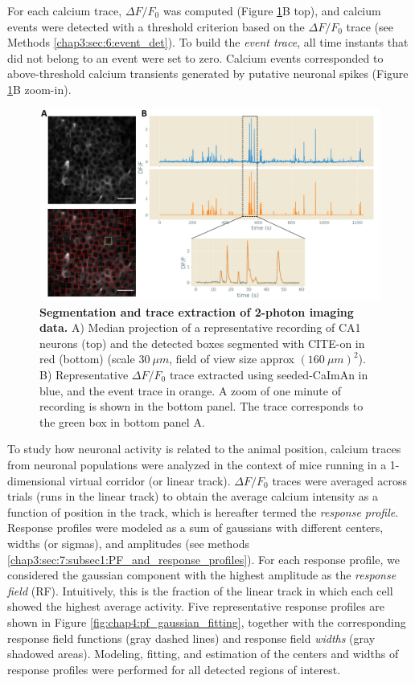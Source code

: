 For each calcium trace, $\Delta F/F_0$ was computed (Figure \ref{fig:chap4:segmentation_traces_2p}B top), and calcium events were detected with a threshold criterion based on the $\Delta F/F_0$ trace (see Methods \ref{chap3:sec:6:event_det}).
To build the \textit{event trace}, all time instants that did not belong to an event were set to zero. 
Calcium events corresponded to above-threshold calcium transients generated by putative neuronal spikes (Figure \ref{fig:chap4:segmentation_traces_2p}B zoom-in).
\begin{figure}[h]
    \centering
    \includegraphics[trim={0 0 150 0},clip,width=\textwidth]{Figures/Chapter4/segmentation_traces_2p.pdf}
    \caption[Segmentation and trace extraction of 2-photon imaging data]{\textbf{Segmentation and trace extraction of 2-photon imaging data.} A) Median projection of a representative recording of CA1 neurons (top) and the detected boxes segmented with CITE-on in red (bottom) (scale $30\ \mu m$, field of view size approx $(160\ \mu m)^2$).
    B) Representative $\Delta F/F_0$ trace extracted using seeded-CaImAn in blue, and the event trace in orange. A zoom of one minute of recording is shown in the bottom panel. The trace corresponds to the green box in bottom panel A.}
    \label{fig:chap4:segmentation_traces_2p}
\end{figure}

To study how neuronal activity is related to the animal position, calcium traces from neuronal populations were analyzed in the context of mice running in a 1-dimensional virtual corridor (or linear track).
$\Delta F/F_0$ traces were averaged across trials (runs in the linear track) to obtain the average calcium intensity as a function of position in the track, which is hereafter termed the \textit{response profile}.
Response profiles were modeled as a sum of gaussians with different centers, widths (or sigmas), and amplitudes (see methods \ref{chap3:sec:7:subsec1:PF_and_response_profiles}). 
For each response profile, we considered the gaussian component with the highest amplitude as the \textit{response field} (RF). 
Intuitively, this is the fraction of the linear track in which each cell showed the highest average activity.
Five representative response profiles are shown in Figure \ref{fig:chap4:pf_gaussian_fitting}, together with the corresponding response field functions (gray dashed lines) and response field \textit{widths} (gray shadowed areas).
Modeling, fitting, and estimation of the centers and widths of response profiles were performed for all detected regions of interest.

